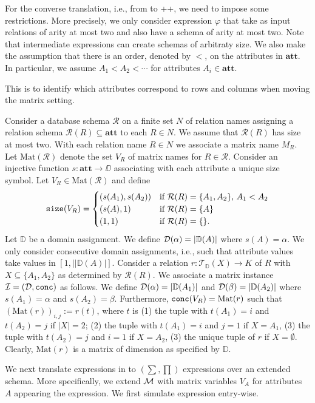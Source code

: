 For the converse translation, i.e., from \ARA to \lang++, we need to impose some restrictions. More precisely, we only consider \ARA expression $\varphi$
that take as input relations of arity at most two and also have a schema of arity at most two. Note that intermediate expressions can create schemas of arbitraty size. We also make the assumption that there is an order, denoted by $<$, on the attributes in $\mathbf{att}$. In particular, we assume $A_1<A_2<\cdots$ for attributes $A_i\in\mathbf{att}$.

This is to identify which attributes correspond to rows and columns when moving the matrix setting. 


Consider a database schema $\mathcal{R}$ on a finite set $N$ of relation names
 assigning a relation schema $\mathcal{R}(R)\subseteq\mathbf{att}$ to each $R \in N$. We assume that $\mathcal{R}(R)$ has size at most two. With each relation name $R\in N$ we associate a matrix name $M_R$. Let $\text{Mat}(\mathcal{R})$ denote the set
 $V_R$ of matrix names for $R\in\mathcal{R}$. Consider an injective function $s:\mathbf{att}\to \DD$ associating with each attribute a unique size symbol. Let $V_R\in \text{Mat}(\mathcal{R})$ and
define
 $$
\texttt{size}(V_R)=\begin{cases}
(s(A_1),s(A_2)) & \text{if $\mathcal{R}(R)=\{A_1,A_2\}$, $A_1<A_2$}\\
(s(A),1) & \text{if $\mathcal{R}(R)=\{A\}$}\\
(1,1) & \text{if $\mathcal{R}(R)=\{\}$}.
\end{cases}
 $$
Let $\mathbb{D}$ be a domain assignment. We define 
$\mathcal{D}(\alpha)=|\mathbb{D}(A)|$ where $s(A)=\alpha$.
We only consider consecutive domain assignments, i.e.,
such that attribute values take values in $[1,||\mathbb{D}(A)|]$.
Consider 
a relation $r:
\mathcal{T}_{\mathbb{D}}(X) \to K$ of $R$ with $X\subseteq\{A_1,A_2\}$  as determined by
$\mathcal{R}(R)$. We associate a matrix instance $\mathcal{I} = (\mathcal{D},\texttt{conc})$ as follows.
We define $\mathcal{D}(\alpha)=|\mathbb{D}(A_1)|$ and
$\mathcal{D}(\beta)=|\mathbb{D}(A_2)|$ where $s(A_1)=\alpha$ and $s(A_2)=\beta$. Furthermore,
$\texttt{conc}(V_R)=\text{Mat}(r)$ such that 
$(\text{Mat}(r))_{i,j} := r(t)$, where $t$ is (1) the tuple with $t(A_1) = i$ and $t(A_2) = j$ if $|X| = 2$; (2) the tuple with $t(A_1) = i$ and $j = 1$ if $X = {A_1}$,
(3) the tuple with $t(A_2) = j$ and $i = 1$ if $X = {A_2}$,
(3) the unique tuple of $r$ if $X=\emptyset$. Clearly, $\text{Mat}(r)$ is a matrix of dimension as
specified by $\mathbb{D}$. 


%
%
We next translate \ARA expressions in to \lang$(\sum,\prod)$ expressions over an extended schema. More specifically, we extend 
$\mathcal{M}$ with matrix variables $V_A$ for attributes $A$ appearing the \ARA expression. We first simulate \ARA expression entry-wise.

